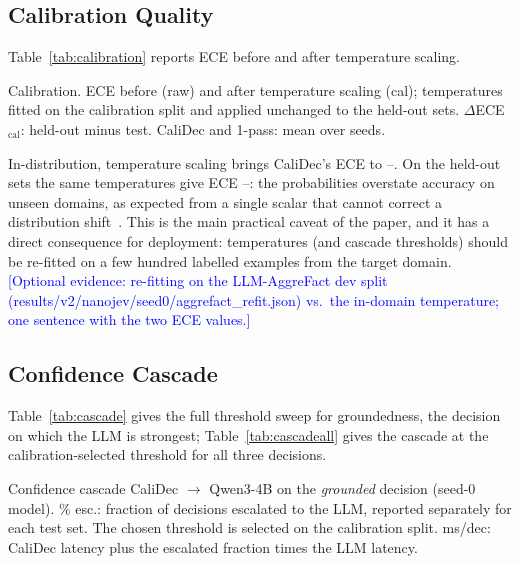 \documentclass[twocolumn]{ICCKjournal}
\newcommand{\revnote}[1]{\textcolor{blue}{[#1]}}
\begin{document}
\subsection{Calibration Quality}
\label{sec:calresults}
Table~\ref{tab:calibration} reports ECE before and after temperature scaling.

\begin{table}[H]
\caption{Calibration. ECE before (raw) and after temperature scaling (cal); temperatures fitted on the calibration split and applied unchanged to the held-out sets. $\Delta$ECE$_{\mathrm{cal}}$: held-out minus test. CaliDec and 1-pass: mean over seeds.}
\label{tab:calibration}
\centering
\small
\begin{adjustbox}{max width=\linewidth}

\end{adjustbox}
\end{table}

In-distribution, temperature scaling brings CaliDec's ECE to \NJEceTestMin--\NJEceTestMax. On the held-out sets the same temperatures give ECE \NJEceHeldMin--\NJEceHeldMax: the probabilities overstate accuracy on unseen domains, as expected from a single scalar that cannot correct a distribution shift~\cite{guo2017calibration}. This is the main practical caveat of the paper, and it has a direct consequence for deployment: temperatures (and cascade thresholds) should be re-fitted on a few hundred labelled examples from the target domain. \revnote{Optional evidence: re-fitting on the LLM-AggreFact dev split (results/v2/nanojev/seed0/aggrefact\_refit.json) vs.\ the in-domain temperature; one sentence with the two ECE values.}

\subsection{Confidence Cascade}
\label{sec:cascaderesults}
Table~\ref{tab:cascade} gives the full threshold sweep for groundedness, the decision on which the LLM is strongest; Table~\ref{tab:cascadeall} gives the cascade at the calibration-selected threshold for all three decisions.

\begin{table}[H]
\caption{Confidence cascade CaliDec $\to$ Qwen3-4B on the \emph{grounded} decision (seed-0 model). \% esc.: fraction of decisions escalated to the LLM, reported separately for each test set. The chosen threshold is selected on the calibration split. ms/dec: CaliDec latency plus the escalated fraction times the LLM latency.}
\label{tab:cascade}
\centering
\small
\begin{adjustbox}{max width=\linewidth}

\end{adjustbox}
\end{table}
\end{document}
